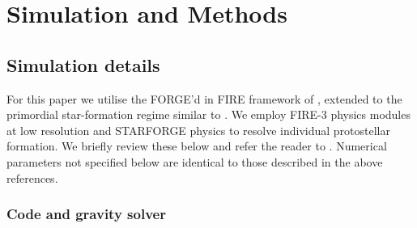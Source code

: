 \documentclass[twocolumn]{openjournal}
\begin{document}
\section{Simulation and Methods}
\label{sec:methods}
\subsection{Simulation details}



For this paper we utilise the FORGE'd in FIRE framework of
\citet{FORGE_d_in_FIRE_Hopkin_2023}, extended to the primordial
star-formation regime similar to \citet{meziani26}.
We employ FIRE-3 \citep{FIRE_3_Updated_Hopkin} physics modules at
low resolution and STARFORGE \citep{STARFORGE_Towa_Grudic_2021}
physics to resolve individual protostellar formation. We briefly review these below and refer the reader to \citet{FIRE_3_Updated_Hopkin, FORGE_d_in_FIRE_Hopkin_2023, STARFORGE_Towa_Grudic_2021}. Numerical parameters not specified below are identical to those described in the above references.

\subsubsection{Code and gravity solver}
\label{sec:hydro}
\end{document}
